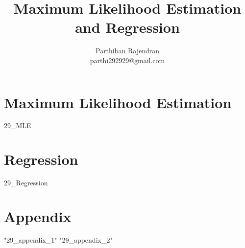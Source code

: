 \documentclass[float=false, crop=false,11pt,oneside]{book}
\title{Maximum Likelihood Estimation and Regression}
\author{Parthiban Rajendran \\ \small parthi292929@gmail.com}
\begin{document}
    
    \maketitle 

    \tableofcontents

    \chapter{Maximum Likelihood Estimation}
	{29_MLE}   
	
    \chapter{Regression}
	{29_Regression}   	
	
    \chapter{Appendix}   
	{"29_appendix_1"}	 
	{"29_appendix_2"}	 

	\nocite{*}
	 	
\end{document}
